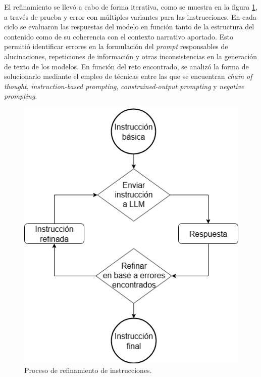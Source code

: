 El refinamiento se llevó a cabo de forma iterativa, como se muestra en la figura \ref{fig:iterativeRefinement},
a través de prueba y error con múltiples variantes para las instrucciones.
En cada ciclo se evaluaron las respuestas del modelo en función tanto de la estructura del contenido como de su coherencia
con el contexto narrativo aportado.
Esto permitió identificar errores en la formulación del \textit{prompt} responsables de alucinaciones,
repeticiones de información y otras inconsistencias en la generación de texto de los modelos.
En función del reto encontrado, se analizó la forma de solucionarlo mediante el empleo de técnicas
entre las que se encuentran \textit{chain of thought}, \textit{instruction-based prompting},
\textit{constrained-output prompting} y \textit{negative prompting}.

\begin{figure}[htbp]
	\centering
	\includegraphics[width=0.7 \textwidth]{./Figures/iterative-process.png}
	\caption{Proceso de refinamiento de instrucciones.}
	\label{fig:iterativeRefinement}
\end{figure}

